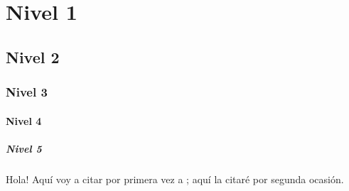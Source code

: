 \documentclass[
          12pt,
              spanish,
                ]{article}
\begin{document}
\hypertarget{nivel-1}{%
\section{Nivel 1}\label{nivel-1}}

\hypertarget{nivel-2}{%
\subsection{Nivel 2}\label{nivel-2}}

\hypertarget{nivel-3}{%
\subsubsection{Nivel 3}\label{nivel-3}}

\hypertarget{nivel-4}{%
\paragraph{Nivel 4}\label{nivel-4}}

\hypertarget{nivel-5}{%
\subparagraph{Nivel 5}\label{nivel-5}}

Hola! Aquí voy a citar por primera vez a \textcite{bernal:hist}; aquí la
citaré por segunda ocasión.\autocite{bernal:hist}




        \printbibliography
\end{document}
